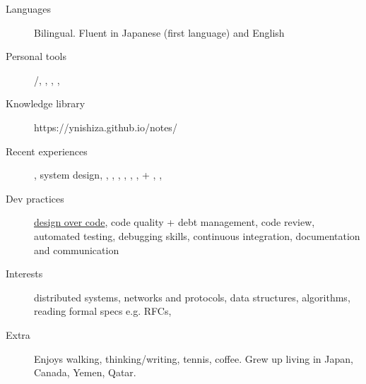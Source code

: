 \begin{description}
  \liststyle
  \item[Languages]{Bilingual. Fluent in Japanese (first language) and English}
  \item[Personal tools]{\rfneovim /\rfvim, \rfbash, \rfgit, \rftmux, \rffirefox }
  \item[Knowledge library]{https://ynishiza.github.io/notes/}
  \item[Recent experiences]{\rfnodejs, system design, \rfmongodb, \rfredis, \rfneofj, \rfdocker, \rfreact, \rfcypress, \rfgit + \rfgithub, \rfaws, \rfjenkins }
  \item[Dev practices]{\href{https://ynishiza.github.io/codingprinciples}{design over code}, code quality + debt management, code review, automated testing, debugging skills, continuous integration, documentation and communication }
  \item[Interests]{distributed systems, networks and protocols, data structures, algorithms, reading formal specs e.g. RFCs, \rfhaskell }
  \item[Extra]{Enjoys walking, thinking/writing, tennis, coffee. Grew up living in Japan, Canada, Yemen, Qatar.}
\end{description}
